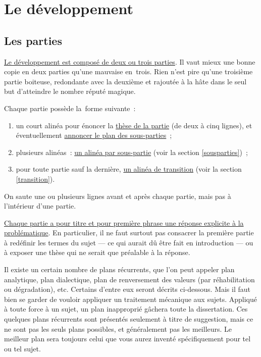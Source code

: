 \documentclass[a4paper,12pt]{article}
\begin{document}
\section{Le développement}
\label{sec-3}
\label{developpement}

\subsection{Les parties}
\label{sec-3-1}
\label{parties}

\uline{Le développement est composé de deux ou trois parties}. Il vaut mieux
une bonne copie en deux parties qu'une mauvaise en trois. Rien n'est
pire qu'une troisième partie boiteuse, redondante avec la deuxième et
rajoutée à la hâte dans le seul but d'atteindre le nombre réputé
magique.

Chaque partie possède la forme suivante :

\begin{enumerate}
\item un court alinéa pour énoncer la \uline{thèse de la partie} (de deux à cinq
lignes), et éventuellement \uline{annoncer le plan des sous-parties} ;
\item plusieurs alinéas : \uline{un alinéa par sous-partie} (voir la section
\ref{sousparties}) ;
\item pour toute partie sauf la dernière, \uline{un alinéa de transition} (voir
la section \ref{transition}).
\end{enumerate}

On saute une ou plusieurs lignes avant et après chaque partie, mais pas
à l'intérieur d'une partie.

\uline{Chaque partie a pour titre et pour première phrase une réponse
explicite à la problématique}. En particulier, il ne faut surtout pas
consacrer la première partie à redéfinir les termes du sujet --- ce qui
aurait dû être fait en introduction --- ou à exposer une thèse qui ne
serait que préalable à la réponse.

Il existe un certain nombre de plans récurrents, que l'on peut appeler
plan analytique, plan dialectique, plan de renversement des valeurs (par
réhabilitation ou dégradation), etc. Certains d'entre eux seront décrits
ci-dessous. Mais il faut bien se garder de vouloir appliquer un
traitement mécanique aux sujets. Appliqué à toute force à un sujet, un
plan inapproprié gâchera toute la dissertation. Ces quelques plans
récurrents sont présentés seulement à titre de suggestion, mais ce ne
sont pas les seuls plans possibles, et généralement pas les meilleurs.
Le meilleur plan sera toujours celui que vous aurez inventé
spécifiquement pour tel ou tel sujet.
\end{document}
